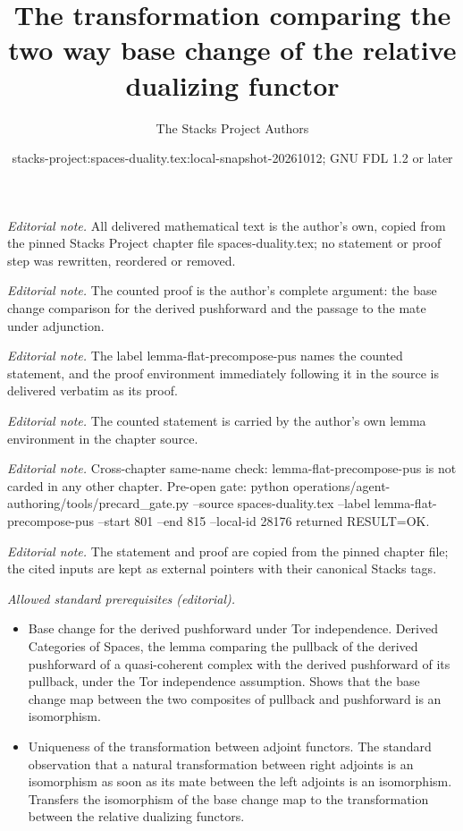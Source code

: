 \documentclass[10pt,a4paper]{amsart}
\title{The transformation comparing the two way base change of the relative dualizing functor}
\author{The Stacks Project Authors}
\date{stacks-project:spaces-duality.tex:local-snapshot-20261012; GNU FDL 1.2 or later}
\theoremstyle{plain}
\theoremstyle{definition}
\theoremstyle{remark}
\numberwithin{equation}{subsection}
\begin{document}
\maketitle
\noindent\textit{Editorial note.} All delivered mathematical text is the author's own, copied from the pinned Stacks Project chapter file spaces-duality.tex; no statement or proof step was rewritten, reordered or removed.\par\medskip
\noindent\textit{Editorial note.} The counted proof is the author's complete argument: the base change comparison for the derived pushforward and the passage to the mate under adjunction.\par\medskip
\noindent\textit{Editorial note.} The label lemma-flat-precompose-pus names the counted statement, and the proof environment immediately following it in the source is delivered verbatim as its proof.\par\medskip
\noindent\textit{Editorial note.} The counted statement is carried by the author's own lemma environment in the chapter source.\par\medskip
\noindent\textit{Editorial note.} Cross-chapter same-name check: lemma-flat-precompose-pus is not carded in any other chapter. Pre-open gate: python operations/agent-authoring/tools/precard\_gate.py --source spaces-duality.tex --label lemma-flat-precompose-pus --start 801 --end 815 --local-id 28176 returned RESULT=OK.\par\medskip
\noindent\textit{Editorial note.} The statement and proof are copied from the pinned chapter file; the cited inputs are kept as external pointers with their canonical Stacks tags.\par\medskip
\noindent\textit{Allowed standard prerequisites (editorial).}\begin{itemize}
\item Base change for the derived pushforward under Tor independence. Derived Categories of Spaces, the lemma comparing the pullback of the derived pushforward of a quasi-coherent complex with the derived pushforward of its pullback, under the Tor independence assumption. Shows that the base change map between the two composites of pullback and pushforward is an isomorphism.
\item Uniqueness of the transformation between adjoint functors. The standard observation that a natural transformation between right adjoints is an isomorphism as soon as its mate between the left adjoints is an isomorphism. Transfers the isomorphism of the base change map to the transformation between the relative dualizing functors.
\end{itemize}\medskip
\end{document}
